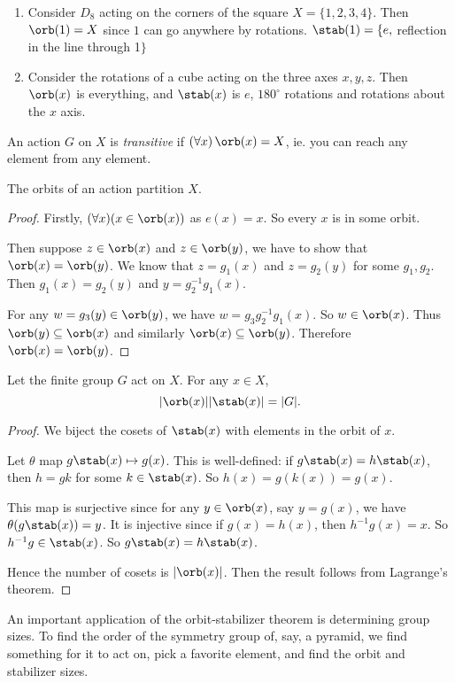 \documentclass[a4paper]{article}
\begin{document}
\begin{eg}\leavevmode
  \begin{enumerate}
    \item Consider $D_8$ acting on the corners of the square $X = \{1, 2, 3, 4\}$. Then $\orb(1) = X$ since $1$ can go anywhere by rotations. $\stab(1) = \{e, $ reflection in the line through 1$\}$
    \item Consider the rotations of a cube acting on the three axes $x, y, z$. Then $\orb(x)$ is everything, and $\stab(x)$ is $e$, $180^\circ$ rotations and rotations about the $x$ axis.
  \end{enumerate}
\end{eg}

\begin{defi}
  An action $G$ on $X$ is \emph{transitive} if $(\forall x)\,\orb(x) = X$, ie. you can reach any element from any element.
\end{defi}

\begin{lemma}
  The orbits of an action partition $X$.
\end{lemma}

\begin{proof}
  Firstly, $(\forall x)(x\in \orb (x))$ as $e(x) = x$. So every $x$ is in some orbit.

  Then suppose $z\in \orb (x)$ and $z\in \orb (y)$, we have to show that $\orb(x) = \orb (y)$. We know that $z = g_1(x)$ and $z = g_2(y)$ for some $g_1, g_2$. Then $g_1(x) = g_2(y)$ and $y = g_2^{-1}g_1(x)$.

  For any $w = g_3(y)\in \orb (y)$, we have $w = g_3g_2^{-1}g_1(x)$. So $w\in \orb (x)$. Thus $\orb (y) \subseteq \orb (x)$ and similarly $\orb (x) \subseteq \orb (y)$. Therefore $\orb (x) = \orb (y)$.
\end{proof}

\begin{thm}
  Let the finite group $G$ act on $X$. For any $x\in X$,
  \[
    |\orb(x)||\stab(x)| = |G|.
  \]
\end{thm}

\begin{proof}
  We biject the cosets of $\stab(x)$ with elements in the orbit of $x$.

  Let $\theta$ map $g\stab(x) \mapsto g(x)$. This is well-defined: if $g\stab(x) = h\stab(x)$, then $h = gk$ for some $k\in \stab(x)$. So $h(x) = g(k(x)) = g(x)$.

  This map is surjective since for any $y\in \orb(x)$, say $y = g(x)$, we have $\theta(g\stab (x)) = y$. It is injective since if $g(x) = h(x)$, then $h^{-1}g(x) = x$. So $h^{-1}g\in \stab (x)$. So $g\stab(x) = h\stab(x)$.

  Hence the number of cosets is $|\orb(x)|$. Then the result follows from Lagrange's theorem.
\end{proof}
An important application of the orbit-stabilizer theorem is determining group sizes. To find the order of the symmetry group of, say, a pyramid, we find something for it to act on, pick a favorite element, and find the orbit and stabilizer sizes.
\end{document}
